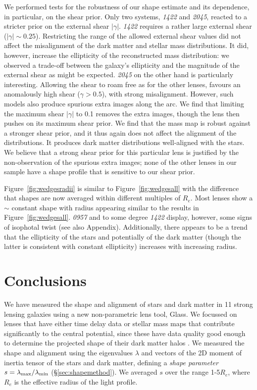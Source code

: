 \documentclass[useAMS,usenatbib]{mn2e}
\def\Glass{{\sc Glass}}
\begin{document}
We performed tests for the robustness of our shape estimate and its dependence, in particular, on the shear prior. Only two systems, {\it1422} and {\it2045}, reacted to a stricter prior on the external shear $|\gamma|$. {\it1422} requires a rather large external shear ($|\gamma|\sim0.25$). Restricting the range of the allowed external shear values did not affect the misalignment of the dark matter and stellar mass distributions. It did, however, increase the ellipticity of the reconstructed mass distribution: we observed a trade-off between the galaxy's ellipticity and the magnitude of the external shear as might be expected. {\it2045} on the other hand is particularly interesting. Allowing the shear to roam free as for the other lenses, favours an anomalously high shear ($\gamma > 0.5$), with strong misalignment. However, such models also produce spurious extra images along the arc. We find that limiting the maximum shear $|\gamma|$ to 0.1 removes the extra images, though the lens then pushes on its maximum shear prior. We find that the mass map is robust against a stronger shear prior, and it thus again does not affect the alignment of the distributions. It produces dark matter distributions well-aligned with the stars. We believe that a strong shear prior for this particular lens is justified by the non-observation of the spurious extra images; none of the other lenses in our sample have a shape profile that is sensitive to our shear prior.

Figure~\ref{fig:wedgesradii} is similar to Figure~\ref{fig:wedgesall} with the difference that shapes are now averaged within different multiples of $R_e$. Most lenses show a $\sim$ constant shape with radius appearing similar to the results in Figure~\ref{fig:wedgesall}. {\it0957} and to some degree {\it1422} display, however, some signs of isophotal twist (see also Appendix). Additionally, there appears to be a trend that the ellipticity of the stars and potentially of the dark matter (though the latter is consistent with constant ellipticity) increases with increasing radius.

\section{Conclusions}\label{sec:conclusions}
We have measured the shape and alignment of stars and dark matter in 11 strong lensing galaxies using a new non-parametric lens tool, \Glass. We focussed on lenses that have either time delay data or stellar mass maps that contribute significantly to the central potential, since these have data quality good enough to determine the projected shape of their dark matter halos \citep{2014arXiv1401.7990C}. We measured the shape and alignment using the eigenvalues $\lambda$ and vectors of the 2D moment of inertia tensor of the stars and dark matter, defining a {\it shape parameter} $s = \lambda_{\rm max}/\lambda_{\rm min}$ (\S\ref{sec:shapemethod}). We averaged $s$ over the range 1-5$R_e$, where $R_e$ is the effective radius of the light profile.
\end{document}

